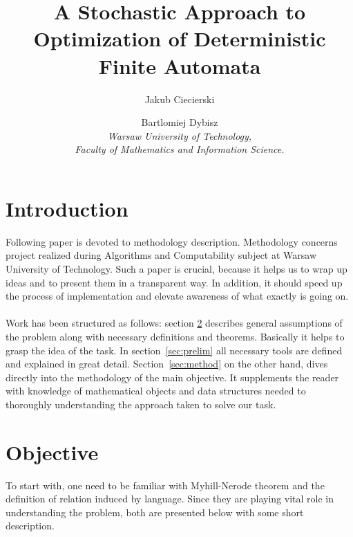 \documentclass[runningheads, a4paper]{llncs}
\begin{document}
\mainmatter  %

\title{A Stochastic Approach to Optimization of Deterministic Finite Automata}


\author{Jakub Ciecierski \and Bartlomiej Dybisz \\ 
\textit{Warsaw University of Technology, \\
Faculty of Mathematics and Information Science.}}
%

\maketitle






\section{Introduction}
Following paper is devoted to methodology description. Methodology concerns project realized during Algorithms and Computability subject at Warsaw University of Technology. Such a paper is crucial, because it helps us to wrap up ideas and to present them in a transparent way. In addition, it should speed up the process of implementation and elevate awareness of what exactly is going on.
\paragraph{}
Work has been structured as follows: section \ref{section:objectives} describes general assumptions of the problem along with necessary definitions and theorems. Basically it helps to grasp the idea of the task. In section~\ref{sec:prelim} all necessary tools are defined and explained in great detail.
Section~\ref{sec:method} on the other hand, dives directly into the methodology of the main objective. It supplements the reader with knowledge of mathematical objects and data structures needed to thoroughly understanding the approach taken to solve our task. 

\section{Objective} \label{section:objectives}
To start with, one need to be familiar with Myhill-Nerode theorem and the definition of relation induced by language. Since they are playing vital role in understanding the problem, both are presented below with some short description. 
\end{document}
